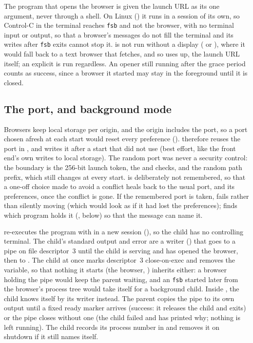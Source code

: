 The program that opens the browser is given the launch URL as its one argument,
never through a shell.  On Linux () it runs in a session of its
own, so Control-C in the terminal reaches \texttt{fsb} and not the browser, with no
terminal input or output, so that a browser's messages do not fill the terminal and
its writes after \texttt{fsb} exits cannot stop it.   is not run
without a display ( or ), where it would fall back
to a text browser that fetches, and so uses up, the launch URL itself; an explicit
 is run regardless.  An opener still running after the grace
period counts as success, since a browser it started may stay in the foreground
until it is closed.

\subsection{The port, and background mode}
\label{sec:port}

Browsers keep local storage per origin, and the origin includes the port, so a port
chosen afresh at each start would reset every preference ().
 therefore reuses the port in , and
writes it after a start that did not use  (best effort, like the front
end's own writes to local storage).  The random port was never a security control:
the boundary is the 256-bit launch token, the  and  checks, and
the random path prefix, which still changes at every start.   is
deliberately not remembered, so that a one-off choice made to avoid a conflict heals
back to the usual port, and its preferences, once the conflict is gone.  If the
remembered port is taken,  fails rather than silently moving (which would
look as if it had lost the preferences);  finds which program
holds it (, below) so that the message can name it.

 re-executes the program with 
in a new session (), so the child has no controlling terminal.  The
child's standard output and error are a writer () that goes to a pipe
on file descriptor~3 until the child is serving and has opened the browser, then to
.  The child at once marks descriptor~3
close-on-exec and removes the variable, so that nothing it starts (the browser,
) inherits either: a browser holding the pipe would keep the parent
waiting, and an \texttt{fsb} started later from the browser's process tree would
take itself for a background child.  Inside , the child knows itself by
its  writer instead.  The parent copies the pipe to its own output
until a fixed ready marker arrives (success: it releases the child and exits) or the
pipe closes without one (the child failed and has printed why; nothing is left
running).  The child records its process number in  and
removes it on shutdown if it still names itself.

